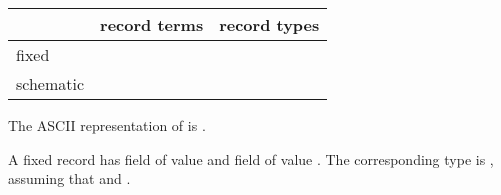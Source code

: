 \begin{isabellebody}
\begin{isamarkuptext}
  \begin{center}
  \begin{tabular}{l|l|l}
    & record terms & record types \\ \hline
    fixed & \isa{{\isachardoublequote}{\isasymlparr}x\ {\isacharequal}\ a{\isacharcomma}\ y\ {\isacharequal}\ b{\isasymrparr}{\isachardoublequote}} & \isa{{\isachardoublequote}{\isasymlparr}x\ {\isacharcolon}{\isacharcolon}\ A{\isacharcomma}\ y\ {\isacharcolon}{\isacharcolon}\ B{\isasymrparr}{\isachardoublequote}} \\
    schematic & \isa{{\isachardoublequote}{\isasymlparr}x\ {\isacharequal}\ a{\isacharcomma}\ y\ {\isacharequal}\ b{\isacharcomma}\ {\isasymdots}\ {\isacharequal}\ m{\isasymrparr}{\isachardoublequote}} &
      \isa{{\isachardoublequote}{\isasymlparr}x\ {\isacharcolon}{\isacharcolon}\ A{\isacharcomma}\ y\ {\isacharcolon}{\isacharcolon}\ B{\isacharcomma}\ {\isasymdots}\ {\isacharcolon}{\isacharcolon}\ M{\isasymrparr}{\isachardoublequote}} \\
  \end{tabular}
  \end{center}

  \noindent The ASCII representation of  is .

  A fixed record  has field  of value
   and field  of value .  The corresponding
  type is , assuming that 
  and .


\end{isamarkuptext}
\end{isabellebody}
